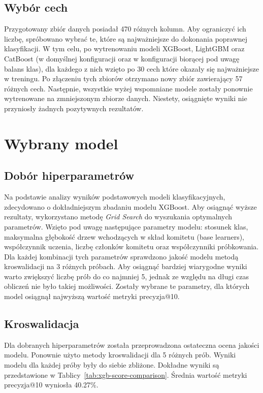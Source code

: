 \documentclass[a4paper,12pt]{article}
\begin{document}
    \subsection{Wybór cech}
    Przygotowany zbiór danych posiadał 470 różnych kolumn.
    Aby ograniczyć ich liczbę, spróbowano wybrać te, które są najważniejsze do dokonania poprawnej klasyfikacji.
    W tym celu, po wytrenowaniu modeli XGBoost, LightGBM oraz CatBoost (w domyślnej konfiguracji oraz w konfiguracji biorącej pod uwagę balans klas), dla każdego z nich wzięto po 30 cech które okazały się najważniejsze w treningu.
    Po złączeniu tych zbiorów otrzymano nowy zbiór zawierający 57 różnych cech.
    Następnie, wszystkie wyżej wspomniane modele zostały ponownie wytrenowane na zmniejszonym zbiorze danych.
    Niestety, osiągnięte wyniki nie przyniosły żadnych pozytywnych rezultatów.

    \section{Wybrany model}

    \subsection{Dobór hiperparametrów}
    Na podstawie analizy wyników podstawowych modeli klasyfikacyjnych, zdecydowano o dokładniejszym zbadaniu modelu XGBoost.
    Aby osiągnąć wyższe rezultaty, wykorzystano metodę \textit{Grid Search} do wyszukania optymalnych parametrów.
    Wzięto pod uwagę następujące parametry modelu: stosunek klas, maksymalna głębokość drzew wchodzących w skład komitetu (base learners), współczynnik uczenia, liczbę członków komitetu oraz współczynniki próbkowania.
    Dla każdej kombinacji tych parametrów sprawdzono jakość modelu metodą kroswalidacji na 3 różnych próbach.
    Aby osiągnąć bardziej wiarygodne wyniki warto zwiększyć liczbę prób do co najmniej 5, jednak ze względu na długi czas obliczeń nie było takiej możliwości.
    Zostały wybrane te parametry, dla których model osiągnął najwyższą wartość metryki precyzja@10.

    \subsection{Kroswalidacja}
    Dla dobranych hiperparametrów została przeprowadzona ostateczna ocena jakości modelu.
    Ponownie użyto metody kroswalidacji dla 5 różnych prób.
    Wyniki modelu dla każdej próby były do siebie zbliżone.
    Dokładne wyniki są przedstawione w Tablicy~\ref{tab:xgb-score-comparison}.
    Średnia wartość metryki precyzja@10 wyniosła 40.27\%.
\end{document}
